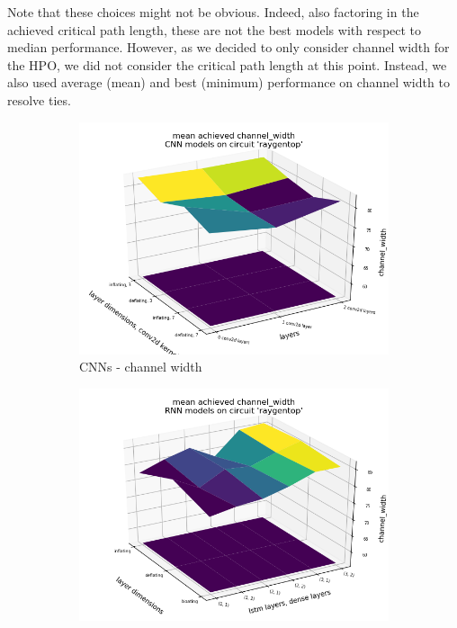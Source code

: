 Note that these choices might not be obvious. Indeed, also factoring in the achieved critical path length, these are not the best models with respect to median performance. However, as we decided to only consider channel width for the \gls{HPO}, we did not consider the critical path length at this point. Instead, we also used average (mean) and best (minimum) performance on channel width to resolve ties.

\begin{figure}
	\begin{subfigure}[b]{0.49\linewidth}
		\includegraphics[width=\linewidth]{plots/cnn-hyperopt-chan-width-with-reference.png}
		\caption{\glspl{CNN} - channel width}
	\end{subfigure}
	\begin{subfigure}[b]{0.49\linewidth}
		\includegraphics[width=\linewidth]{plots/rnn-hyperopt-chan-width-with-reference.png}

\end{subfigure}
\end{figure}
